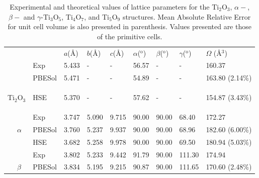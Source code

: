  \begin{table}[ht!]
  \centering
  \caption{\label{tab:struct-relax-prb} Experimental and theoretical values of lattice parameters for the Ti${}_2$O${}_3$, $\alpha-$, $\beta-$ and $\gamma$-Ti${}_3$O${}_5$, Ti${}_4$O${}_7$, and Ti${}_5$O${}_9$ structures. Mean Absolute Relative Error for unit cell volume is also presented in parenthesis. Values presented are those of the primitive cells.}
   \begin{tabular}{*{2}{p{}} p{} *{3}{p{}} *{3}{p{}} *{1}{p{}}} 
  \hhline{==========}
       &               &                          & $a$(\AA) & $b$(\AA) & $c$(\AA) & $\alpha$(${}^{\mathrm{o}}$) & $\beta$(${}^{\mathrm{o}}$) & $\gamma$(${}^{\mathrm{o}}$) & $\Omega$ (\AA${}^3$) \\
  \hhline{==========}
  &  &    Exp\cite{Robinson1974,Abrahams1963} & 5.433 & -      & -        & 56.57  & -      & -                         & 160.37               \\
  &  &    PBESol                              & 5.471   & -      & -        & 54.89  & -      & -                         & 163.80 (2.14\%)      \\
  \multicolumn{2}{c}{\multirow{-3}{*}{\begin{sideways}Ti${}_2$O${}_3$\end{sideways}}} &  HSE           & 5.370  & -      & -        & 57.62   & -      & -               & 154.87 (3.43\%)       \\
             \hhline{==========}
       &               & Exp\cite{Rusakov2002}    & 3.747    & 5.090    & 9.715    & 90.00                       & 90.00                      & 68.40                       & 172.27 \\
       &      $\alpha$ & PBESol                   & 3.760    & 5.237    & 9.937    & 90.00                       & 90.00                      & 68.96                       & 182.60 (6.00\%) \\
       &               & HSE                      & 3.682    & 5.258    & 9.978    & 90.00                       & 90.00                      & 69.50                       & 180.94 (5.03\%) \\
             \cline{2-10}
       &               & Exp\cite{Asbrink1959} & 3.802    & 5.233    & 9.442    & 91.79                       & 90.00                      & 111.30                      & 174.94 \\
       &      $\beta$  & PBESol                   & 3.834    & 5.195    & 9.215    & 90.87                       & 90.00                      & 111.65                      & 170.60 (2.48\%) \\

\end{tabular}
\end{table}
